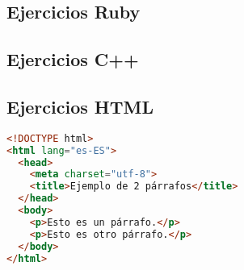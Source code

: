 \subsection{Ejercicios Ruby}

\subsection{Ejercicios C++}

\subsection{Ejercicios HTML}

\begin{lstlisting}[language=html]
<!DOCTYPE html>
<html lang="es-ES">
  <head>
    <meta charset="utf-8">
    <title>Ejemplo de 2 párrafos</title>
  </head>
  <body>
    <p>Esto es un párrafo.</p>
    <p>Esto es otro párrafo.</p>
  </body>
</html>
\end{lstlisting}

